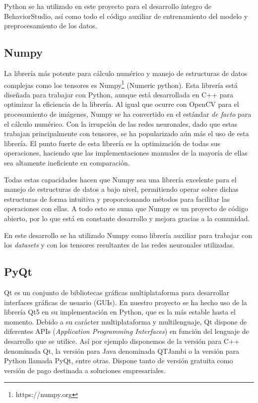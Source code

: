 Python se ha utilizado en este proyecto para el desarrollo íntegro de BehaviorStudio, así como todo el código auxiliar de entrenamiento del modelo y preprocesamiento de los datos.

\subsection{Numpy}

La librería más potente para cálculo numérico y manejo de estructuras de datos complejas como los tensores es Numpy\footnote{https://numpy.org} (Numeric python). Esta librería está diseñada para trabajar con Python, aunque está desarrollada en C++ para optimizar la eficiencia de la librería. Al igual que ocurre con OpenCV para el procesamiento de imágenes, Numpy se ha convertido en el estándar \textit{de facto} para el cálculo numérico. Con la irrupción de las redes neuronales, dado que estas trabajan principalmente con tensores, se ha popularizado aún más el uso de esta librería. El punto fuerte de esta librería es la optimización de todas sus operaciones, haciendo que las implementaciones manuales de la mayoría de ellas sea altamente ineficiente en comparación.

Todas estas capacidades hacen que Numpy sea una librería excelente para el manejo de estructuras de datos a bajo nivel, permitiendo operar sobre dichas estructuras de forma intuitiva y proporcionando métodos para facilitar las operaciones con ellas. A todo esto se suma que Numpy es un proyecto de código abierto, por lo que está en constante desarrollo y mejora gracias a la comunidad.

En este desarrollo se ha utilizado Numpy como librería auxiliar para trabajar con los \textit{datasets} y con los tensores resultantes de las redes neuronales utilizadas.

\subsection{PyQt}

Qt es un conjunto de bibliotecas gráficas multiplataforma para desarrollar interfaces gráficas de usuario (GUIs). En nuestro proyecto se ha hecho uso de la librería Qt5 en su implementación en Python, que es la más estable hasta el momento. Debido a su carácter multiplataforma y multilenguaje, Qt dispone de diferentes APIs (\textit{Application Programming Interfaces}) en función del lenguaje de desarrollo que se utilice. Así por ejemplo disponemos de la versión para C++ denominada Qt, la versión para Java denominada QTJambi o la versión para Python llamada PyQt, entre otras. Dispone tanto de versión gratuita como versión de pago destinada a soluciones empresariales.

